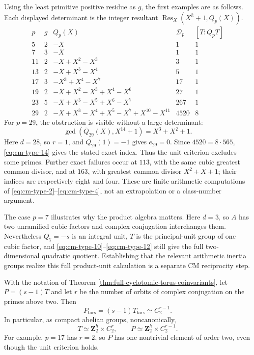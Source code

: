 Using the least primitive positive residue as \(g\), the first
examples are as follows. Each displayed determinant is the
integer resultant \(\operatorname{Res}_X(X^h+1,Q_p(X))\).
\[
\begin{array}{c|c|l|r|c}
 p&g&Q_p(X)&\mathcal D_p&[T:Q_pT]\\\hline
 5&2&-X&1&1\\
 7&3&-X&1&1\\
 11&2&-X+X^2-X^3&3&1\\
 13&2&-X+X^3-X^4&5&1\\
 17&3&-X^3+X^4-X^7&17&1\\
 19&2&-X+X^2-X^3+X^4-X^6&27&1\\
 23&5&-X+X^3-X^5+X^6-X^7&267&1\\
 29&2&-X+X^3-X^4+X^5-X^7+X^{10}-X^{11}&4520&8
\end{array}
\]
For \(p=29\), the obstruction is visible without a large
determinant:
\[
 \gcd(\overline Q_{29}(X),X^{14}+1)=X^3+X^2+1.
\]
Here \(d=28\), so \(r=1\), and \(Q_{29}(1)=-1\) gives
\(e_{29}=0\). Since \(4520=8\cdot565\), \eqref{eq:cm-type-14} gives the
stated exact index. Thus the unit criterion excludes
some primes. Further exact failures occur at \(113\), with
the same cubic greatest common divisor, and at \(163\), with
greatest common divisor \(X^2+X+1\); their indices are respectively
eight and four. These are finite arithmetic computations of
\eqref{eq:cm-type-2}--\eqref{eq:cm-type-4}, not an extrapolation or a class-number argument.

The case \(p=7\) illustrates why the product algebra matters.
Here \(d=3\), so \(A\) has two unramified cubic factors and
complex conjugation interchanges them. Nevertheless \(Q_7=-s\)
is an integral unit, \(T\) is the principal-unit group of one
cubic factor, and \eqref{eq:cm-type-10}--\eqref{eq:cm-type-12} still give the full two-dimensional
quadratic quotient. Establishing that the relevant arithmetic
inertia groups realize this full product-unit calculation is a
separate CM reciprocity step.

\begin{proposition}\label{prop:cm-commutator-torus-torsion}
With the notation of Theorem
\ref{thm:full-cyclotomic-torus-coinvariants}, let \(P=(s-1)T\)
and let \(r\) be the number of orbits of complex conjugation on
the primes above two. Then
\[
 P_{\mathrm{tors}}=(s-1)T_{\mathrm{tors}}
       \simeq C_2^{r-1}.
\]
In particular, as compact abelian groups, noncanonically,
\[
       T\simeq\mathbf Z_2^h\times C_2^r,
       \qquad P\simeq\mathbf Z_2^h\times C_2^{r-1}.
\]
For example, \(p=17\) has \(r=2\), so \(P\) has one
nontrivial element of order two, even though the unit criterion
holds.
\end{proposition}

